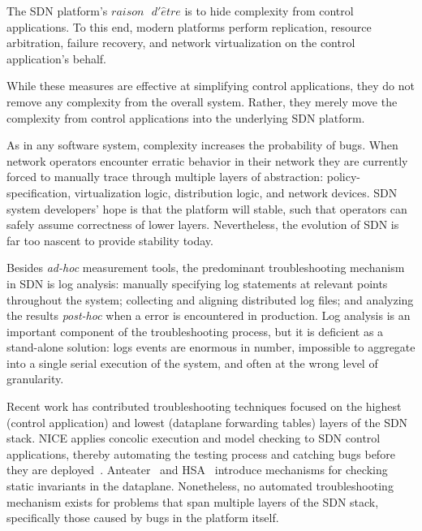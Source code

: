 The SDN platform's $raison\text{ }d'\hat{e}tre$ is to 
hide complexity from control applications. To this end, modern platforms perform
replication, resource arbitration, failure recovery, and network 
virtualization on the control application's behalf. 

While these measures are effective at simplifying control applications,
they do not remove any complexity from the overall system. Rather, they merely move the complexity
from control applications into the underlying SDN platform. 

As in any software system, complexity increases the probability of
bugs. When network operators encounter erratic behavior in their network
they are currently forced to manually trace through
multiple layers of abstraction: policy-specification, virtualization logic, distribution logic, and
network devices. SDN system
developers' hope is that the platform will stable, such that
operators can safely assume correctness of lower layers.
Nevertheless, the evolution of SDN is far too nascent to provide stability
today.

Besides {\it ad-hoc} measurement tools,
the predominant troubleshooting mechanism in SDN is
log analysis: manually specifying log statements at relevant points throughout the system;
collecting and aligning distributed log files; and analyzing the
results {\it post-hoc} when a error is encountered in production. Log analysis
is an important component of the troubleshooting process, but it is deficient
as a stand-alone solution: logs events
are enormous in number, impossible to aggregate into a single serial
execution of the system, and often at the wrong level of granularity.

Recent work has contributed troubleshooting techniques focused on the highest (control
application) and lowest (dataplane forwarding tables) layers of the SDN stack.
NICE applies concolic execution and model checking to SDN control
applications, thereby automating the testing process and catching bugs before
they are deployed~\cite{nice}. Anteater~\cite{anteater} and HSA~\cite{hsa}
introduce mechanisms for checking static invariants in the dataplane.
Nonetheless, no automated troubleshooting mechanism exists for problems that span
multiple layers of the SDN stack, specifically those caused by bugs in the platform
itself.


